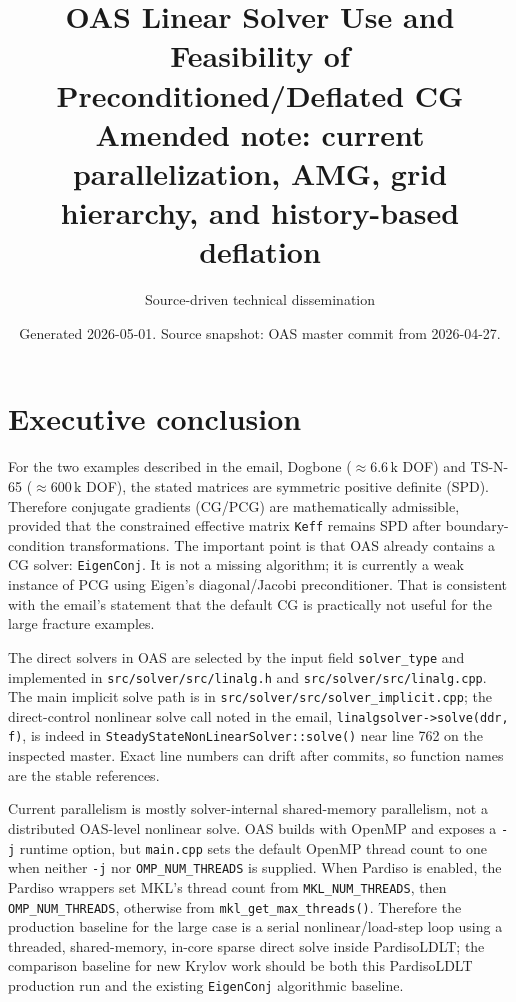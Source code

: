 \documentclass[10pt,a4paper]{article}
\title{OAS Linear Solver Use and Feasibility of Preconditioned/Deflated CG\\[0.3em]{\large Amended note: current parallelization, AMG, grid hierarchy, and history-based deflation}}
\author{Source-driven technical dissemination}
\date{Generated 2026-05-01. Source snapshot: OAS master commit \code{3ce5a809} from 2026-04-27.}
\newcommand{\code}[1]{\texttt{#1}}
\begin{document}
\maketitle
\vspace{-1.2em}

\section*{Executive conclusion}

For the two examples described in the email, Dogbone ($\approx 6.6\,\mathrm{k}$ DOF) and TS-N-65 ($\approx 600\,\mathrm{k}$ DOF), the stated matrices are symmetric positive definite (SPD). Therefore conjugate gradients (CG/PCG) are mathematically admissible, provided that the constrained effective matrix \code{Keff} remains SPD after boundary-condition transformations. The important point is that OAS already contains a CG solver: \code{EigenConj}. It is not a missing algorithm; it is currently a weak instance of PCG using Eigen's diagonal/Jacobi preconditioner. That is consistent with the email's statement that the default CG is practically not useful for the large fracture examples.

The direct solvers in OAS are selected by the input field \code{solver\_type} and implemented in \code{src/solver/src/linalg.h} and \code{src/solver/src/linalg.cpp}. The main implicit solve path is in \code{src/solver/src/solver\_implicit.cpp}; the direct-control nonlinear solve call noted in the email, \code{linalgsolver->solve(ddr, f)}, is indeed in \code{SteadyStateNonLinearSolver::solve()} near line 762 on the inspected master. Exact line numbers can drift after commits, so function names are the stable references.

Current parallelism is mostly solver-internal shared-memory parallelism, not a distributed OAS-level nonlinear solve. OAS builds with OpenMP and exposes a \code{-j} runtime option, but \code{main.cpp} sets the default OpenMP thread count to one when neither \code{-j} nor \code{OMP\_NUM\_THREADS} is supplied. When Pardiso is enabled, the Pardiso wrappers set MKL's thread count from \code{MKL\_NUM\_THREADS}, then \code{OMP\_NUM\_THREADS}, otherwise from \code{mkl\_get\_max\_threads()}. Therefore the production baseline for the large case is a serial nonlinear/load-step loop using a threaded, shared-memory, in-core sparse direct solve inside PardisoLDLT; the comparison baseline for new Krylov work should be both this PardisoLDLT production run and the existing \code{EigenConj} algorithmic baseline.
\end{document}
